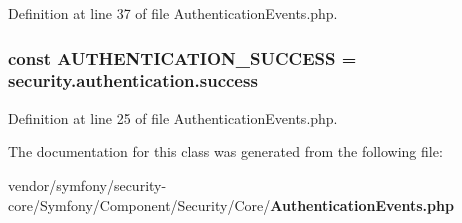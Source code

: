 Definition at line 37 of file Authentication\+Events.\+php.

\subsubsection[{A\+U\+T\+H\+E\+N\+T\+I\+C\+A\+T\+I\+O\+N\+\_\+\+S\+U\+C\+C\+E\+S\+S}]{\setlength{\rightskip}{0pt plus 5cm}const A\+U\+T\+H\+E\+N\+T\+I\+C\+A\+T\+I\+O\+N\+\_\+\+S\+U\+C\+C\+E\+S\+S = \textquotesingle{}security.\+authentication.\+success\textquotesingle{}}\label{class_symfony_1_1_component_1_1_security_1_1_core_1_1_authentication_events_ac046af88fec570970c00d3e07389d658}


Definition at line 25 of file Authentication\+Events.\+php.



The documentation for this class was generated from the following file\+:\begin{DoxyCompactItemize}
\item 
vendor/symfony/security-\/core/\+Symfony/\+Component/\+Security/\+Core/{\bf Authentication\+Events.\+php}\end{DoxyCompactItemize}
